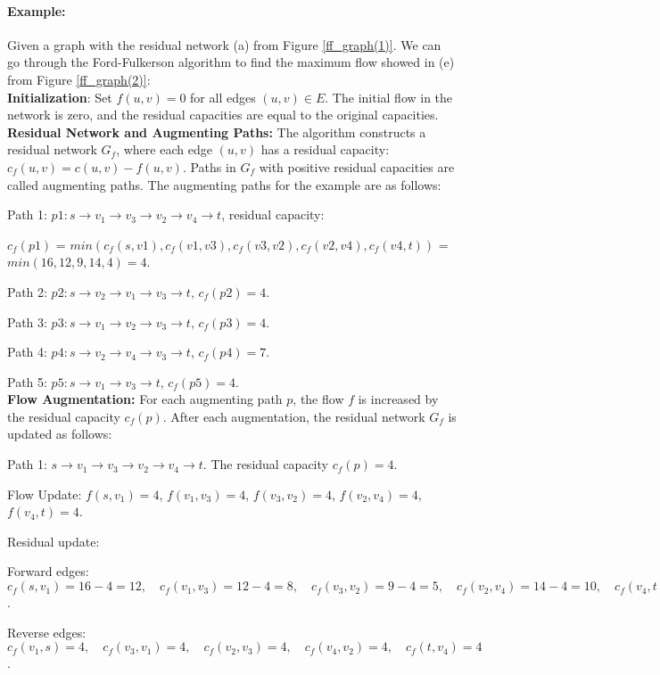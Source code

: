 \paragraph{Example:} Given a graph with the residual network (a) from Figure \ref{ff_graph(1)}. We can go through the Ford-Fulkerson algorithm to find the maximum flow showed in (e) from Figure \ref{ff_graph(2)}:\\
\textbf{Initialization}: Set $f(u, v) = 0$ for all edges $(u, v) \in E$. The initial flow in the network is zero, and the residual capacities are equal to the original capacities.\\
\textbf{Residual Network and Augmenting Paths:} The algorithm constructs a residual network $G_f$, where each edge $(u, v)$ has a residual capacity:$c_f(u, v) = c(u, v) - f(u, v)$. Paths in $G_f$ with positive residual capacities are called augmenting paths. The augmenting paths for the example are as follows:
\par Path 1: $p1: s \to v_1 \to v_3 \to v_2 \to v_4 \to t$, residual capacity:
\par \quad $ c_f(p1)$ = $min(c_f(s,v1), c_f(v1,v3), c_f(v3,v2), c_f(v2,v4), c_f(v4,t))$ = $min(16, 12, 9, 14, 4)=4$.
\par Path 2: $p2: s \to v_2 \to v_1 \to v_3 \to t$, \quad $c_f(p2)=4$.
\par Path 3: $p3: s \to v_1 \to v_2 \to v_3 \to t$, \quad $c_f(p3)=4$.
\par Path 4: $p4: s \to v_2 \to v_4 \to v_3 \to t$, \quad $c_f(p4)=7$.
\par Path 5: $p5: s \to v_1 \to v_3 \to t$, \quad $c_f(p5)=4$.
\\
\textbf{Flow Augmentation:} For each augmenting path $p$, the flow $f$ is increased by the residual capacity $c_f(p)$. After each augmentation, the residual network $G_f$ is updated as follows:

\par Path 1: $s \to v_1 \to v_3 \to v_2 \to v_4 \to t$. The residual capacity $c_f(p) = 4$. 
\par \quad Flow Update: $f(s, v_1) = 4$, $f(v_1, v_3) = 4$, $f(v_3, v_2) = 4$, $f(v_2, v_4) = 4$, $f(v_4, t) = 4$.
\par \quad Residual update:
\par\quad Forward edges: $c_f(s, v_1) = 16 - 4 = 12, \quad c_f(v_1, v_3) = 12 - 4 = 8, \quad c_f(v_3, v_2) = 9 - 4 = 5, \quad c_f(v_2, v_4) = 14 - 4 = 10, \quad c_f(v_4, t) = 4 - 4 = 0$.
\par \quad Reverse edges: $ c_f(v_1, s) = 4, \quad c_f(v_3, v_1) = 4, \quad c_f(v_2, v_3) = 4, \quad c_f(v_4, v_2) = 4, \quad c_f(t, v_4) = 4$.

